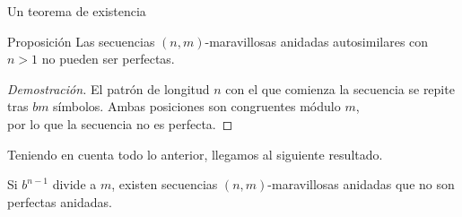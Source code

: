 \documentclass[spanish,xcolor={table}]{beamer}
\begin{document}

\begin{frame}{Un teorema de existencia}

  \begin{block}{Proposición}
    Las secuencias $(n,m)$-maravillosas anidadas autosimilares
    con $n > 1$ no pueden ser perfectas.
  \end{block}

  \begin{proof}[Demostración\nopunct]
    El patrón de longitud $n$ con el que comienza la secuencia se repite tras $bm$ símbolos. Ambas posiciones son congruentes módulo $m$, \\
    por lo que la secuencia no es perfecta.
  \end{proof}

  \bigskip

  Teniendo en cuenta todo lo anterior, llegamos al siguiente resultado.

  \begin{theorem}
    Si $b^{n-1}$ divide a $m$, existen secuencias $(n,m)$-maravillosas anidadas
    que no son perfectas anidadas.
  \end{theorem}
  
  \end{frame}

\end{document}
